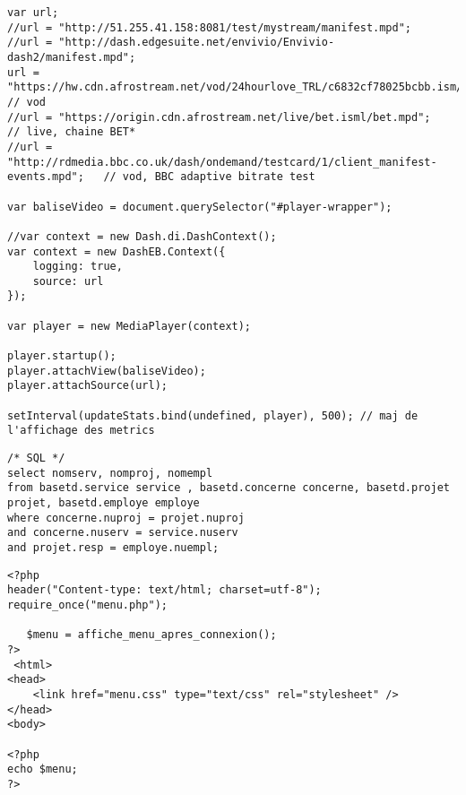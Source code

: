 \begin{verbatim}
var url;
//url = "http://51.255.41.158:8081/test/mystream/manifest.mpd"; 
//url = "http://dash.edgesuite.net/envivio/Envivio-dash2/manifest.mpd";
url = "https://hw.cdn.afrostream.net/vod/24hourlove_TRL/c6832cf78025bcbb.ism/c6832cf78025bcbb.mpd"; // vod 
//url = "https://origin.cdn.afrostream.net/live/bet.isml/bet.mpd";    // live, chaine BET*
//url = "http://rdmedia.bbc.co.uk/dash/ondemand/testcard/1/client_manifest-events.mpd";   // vod, BBC adaptive bitrate test 

var baliseVideo = document.querySelector("#player-wrapper");

//var context = new Dash.di.DashContext();
var context = new DashEB.Context({
	logging: true,
	source: url
});

var player = new MediaPlayer(context);

player.startup();
player.attachView(baliseVideo);
player.attachSource(url);

setInterval(updateStats.bind(undefined, player), 500); // maj de l'affichage des metrics
\end{verbatim}


\begin{verbatim}
/* SQL */
select nomserv, nomproj, nomempl
from basetd.service service , basetd.concerne concerne, basetd.projet projet, basetd.employe employe
where concerne.nuproj = projet.nuproj
and concerne.nuserv = service.nuserv
and projet.resp = employe.nuempl;
\end{verbatim}


\begin{verbatim}
<?php
header("Content-type: text/html; charset=utf-8");
require_once("menu.php");

   $menu = affiche_menu_apres_connexion();
?>
 <html>
<head>
    <link href="menu.css" type="text/css" rel="stylesheet" /> 
</head>
<body>    
  
<?php
echo $menu;
?>
\end{verbatim}





